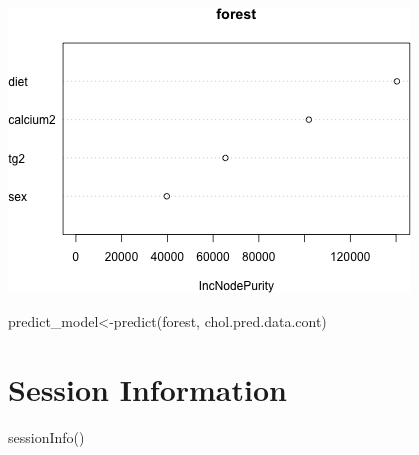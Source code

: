 \documentclass[
]{article}
\newenvironment{Shaded}{\begin{snugshade}}{\end{snugshade}}
\newcommand{\FunctionTok}[1]{\textcolor[rgb]{0.00,0.00,0.00}{#1}}
\newcommand{\NormalTok}[1]{#1}
\newcommand{\OtherTok}[1]{\textcolor[rgb]{0.56,0.35,0.01}{#1}}
\begin{document}
\includegraphics{figures/random-forrest-3.png}

\begin{Shaded}
\begin{Highlighting}[]
\NormalTok{predict\_model}\OtherTok{\textless{}{-}}\FunctionTok{predict}\NormalTok{(forest, chol.pred.data.cont)}
\end{Highlighting}
\end{Shaded}

\hypertarget{session-information}{%
\section{Session Information}\label{session-information}}

\begin{Shaded}
\begin{Highlighting}[]
\FunctionTok{sessionInfo}\NormalTok{()}
\end{Highlighting}
\end{Shaded}
\end{document}
